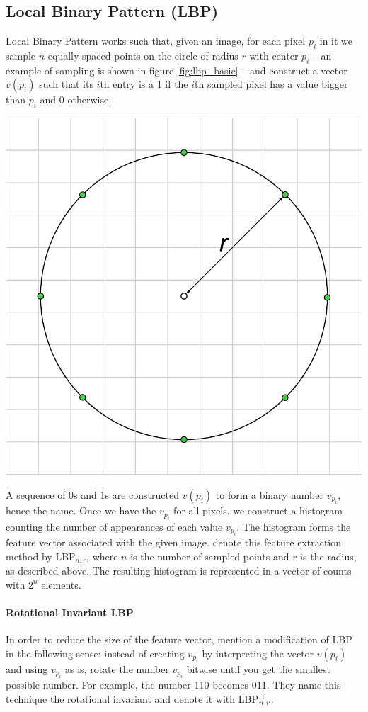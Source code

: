 \begin{multicols}{2}
\subsection{Local Binary Pattern (LBP)}
Local Binary Pattern works such that, given an image, for each pixel $p_i$ in it we sample $n$ equally-spaced points on the circle of radius $r$ with center $p_i$ -- an example of sampling is shown in figure \ref{fig:lbp_basic} -- and construct a vector $v(p_i)$ such that its $i$th entry is a 1 if the $i$th sampled pixel has a value bigger than $p_i$ and 0 otherwise. 
\begin{Figure}
	\centering
	\includegraphics[width=0.5\linewidth]{images/lbp_basic.pdf}
	\label{fig:lbp_basic}
\end{Figure}
A sequence of 0s and 1s are constructed $v(p_i)$ to form a binary number $v_{p_i}$, hence the name. Once we have the $v_{p_i}$ for all pixels, we construct a histogram counting the number of appearances of each value $v_{p_i}$. The histogram forms the feature vector associated with the given image. \citet{kylberg2011virus} denote this feature extraction method by LBP$_{n, r}$, where $n$ is the number of sampled points and $r$ is the radius, as described above. The resulting histogram is represented in a vector of counts with $2^n$ elements. 
\paragraph{Rotational Invariant LBP} In order to reduce the size of the feature vector, \citet{kylberg2011virus} mention a modification of LBP in the following sense: instead of creating $v_{p_i}$ by interpreting the vector $v(p_i)$ and using $v_{p_i}$ as is, rotate the number $v_{p_i}$ bitwise until you get the smallest possible number. For example, the number 110 becomes 011. They name this technique the rotational invariant and denote it with LBP$^{\textnormal{ri}}_{n,r}$.

\end{multicols}
